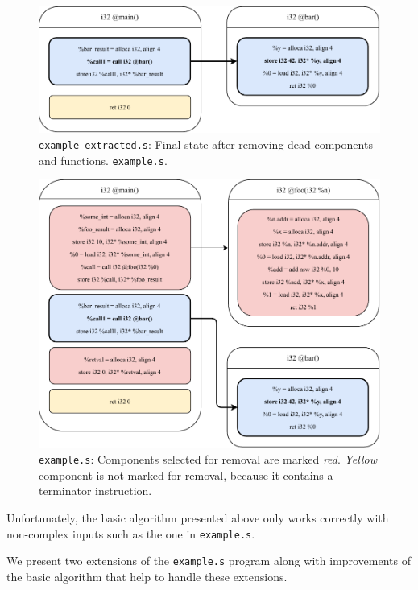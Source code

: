 \documentclass[12pt, twoside]{fithesis2}
\renewcommand{\_}{\leavevmode \kern0.07em\vbox{\hrule width0.4em}}
\begin{document}
\begin{figure}[ht]
    \centering
    \includegraphics[]{images/main_removing_done.pdf}
    \caption{
    \texttt{example_extracted.s}:
    Final state after removing dead components and functions.
    \texttt{example.s}.
    }
    \label{fig:removing_done}
\end{figure}

\begin{figure}[ht]
    \centering
    \includegraphics[]{images/main_removing_prepare.pdf}
    \caption{
    \texttt{example.s}:
    Components selected for removal are marked \emph{red}.
    \emph{Yellow} component is not marked for removal, because it contains a
    terminator instruction.
    }
    \label{fig:removing_prepare}
\end{figure}

Unfortunately, the basic algorithm presented above only works correctly with
non-complex inputs such as the one in \texttt{example.s}.

We present two extensions of the \texttt{example.s} program along with
improvements of the basic algorithm that help to handle these extensions.
\end{document}
